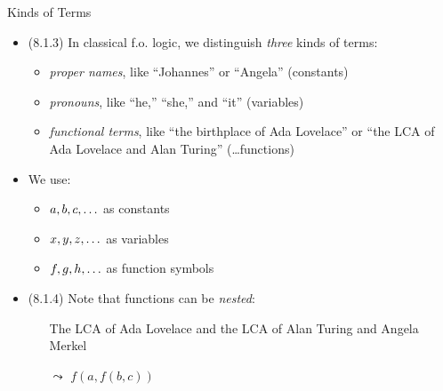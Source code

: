 \begin{frame}{Kinds of Terms}

	\begin{itemize}
	
		\item (8.1.3) In classical f.o. logic, we distinguish \emph{three} kinds of terms:
		
		\begin{itemize}
		
			\item \emph{proper names}, like ``Johannes'' or ``Angela'' (constants)
			
			\item \emph{pronouns}, like ``he,'' ``she,'' and ``it'' (variables)
			
			\item \emph{functional terms}, like ``the birthplace of Ada Lovelace'' or ``the LCA of Ada Lovelace and Alan Turing'' (\dots functions)
		
		\end{itemize}
		
		\item We use:
		
			\begin{itemize}
			
				\item $a,b,c,\mathellipsis$ as constants
				
				\item $x,y,z,\mathellipsis$ as variables
				
				\item $f,g,h,\mathellipsis$ as function symbols
			
			\end{itemize}
			
		\item (8.1.4) Note that functions can be \emph{nested}:
		
			\begin{itemize}
			
				\item[] The LCA of Ada Lovelace and the LCA of Alan Turing and Angela Merkel
				
				\item[$\leadsto$]  $f(a,f(b,c))$ 
			
			\end{itemize}
	
	\end{itemize}

\end{frame}

